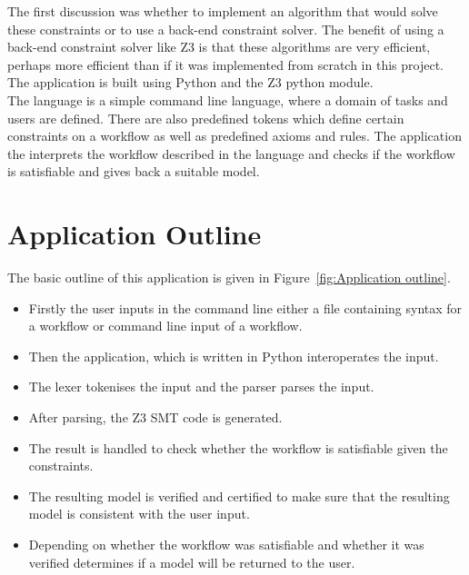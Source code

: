 \documentclass[a4paper]{report}
\begin{document}
The first discussion was whether to implement an algorithm that would solve these constraints or to use a back-end constraint solver. The benefit of using a back-end constraint solver like Z3 is that these algorithms are very efficient, perhaps more efficient than if it was implemented from scratch in this project. The application is built using Python\cite{python} and the Z3 python module\cite{Z3Python}. \\

The language is a simple command line language, where a domain of tasks and users are defined. There are also predefined tokens which define certain constraints on a workflow as well as predefined axioms and rules. The application the interprets the workflow described in the language and checks if the workflow is satisfiable and gives back a suitable model.

\section{Application Outline}
The basic outline of this application is given in Figure~\ref{fig:Application outline}.
\begin{itemize}
\item Firstly the user inputs in the command line either a file containing syntax for a workflow or command line input of a workflow.
\item Then the application, which is written in Python interoperates the input.
\item The lexer tokenises the input and the parser parses the input.
\item After parsing, the Z3 SMT code is generated.
\item The result is handled to check whether the workflow is satisfiable given the constraints.
\item The resulting model is verified and certified to make sure that the resulting model is consistent with the user input.
\item Depending on whether the workflow was satisfiable and whether it was verified determines if a model will be returned to the user.
\end{itemize}
\end{document}
